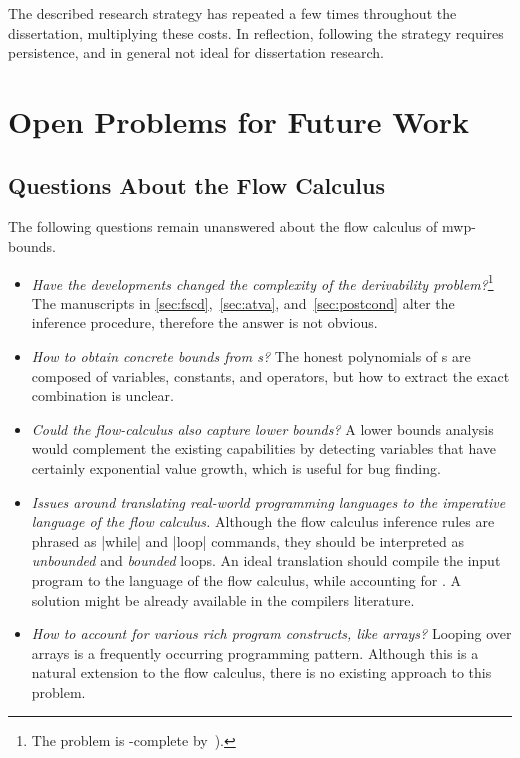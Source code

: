 The described research strategy has repeated a few times throughout the dissertation, multiplying these costs.
In reflection, following the strategy requires persistence, and in general not ideal for dissertation research.

\section{Open Problems for Future Work}
\label{sec:res-future}

\subsection{Questions About the Flow Calculus}
\label{ssec:mwp-open}

The following questions remain unanswered about the flow calculus of
mwp-bounds.

\begin{itemize}
\item \emph{Have the developments changed the complexity of the derivability
        problem?}\footnote{The problem is -complete by~\cite[p.
        37]{jones2009}).}
      The manuscripts in \autoref{sec:fscd},~\autoref{sec:atva},
      and~\autoref{sec:postcond} alter the inference procedure, therefore the
      answer is not obvious.

\item \emph{How to obtain concrete bounds from s?}
      The honest polynomials of s are composed of variables,
      constants, and operators, but how to extract the exact combination is
      unclear.

\item \emph{Could the flow-calculus also capture lower bounds?}
      A lower bounds analysis would complement the existing capabilities by
      detecting variables that have certainly exponential value growth, which
      is useful \eg for bug finding.

\item \emph{Issues around translating real-world programming languages to the
      imperative language of the flow calculus.}
      Although the flow calculus inference rules are phrased as \pr|while| and
      \pr|loop| commands, they should be interpreted as \emph{unbounded} and
      \emph{bounded} loops. An ideal translation should compile the input
      program to the language of the flow calculus, while accounting for . A solution might be already available in the
      compilers literature.

\item \emph{How to account for various rich program constructs,
      like arrays?}
     Looping over arrays is a frequently occurring programming pattern.
     Although this is a natural extension to the flow calculus,
     there is no existing approach to this problem.

\end{itemize}

